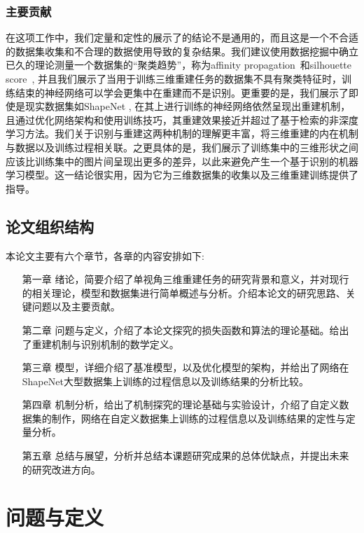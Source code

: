 \documentclass[bachelor, nocolorlinks, printoneside]{seuthesis} %
\begin{document}
\begin{Main}
\subsection{主要贡献}
在这项工作中，我们定量和定性的展示了\cite{tatarchenko2019single}的结论不是通用的，而且这是一个不合适的数据集收集和不合理的数据使用导致的复杂结果。我们建议使用数据挖掘中确立已久的理论测量一个数据集的“聚类趋势”，称为affinity propagation~\cite{wang2008adaptive}和silhouette score~\cite{van2015using}, 并且我们展示了当用于训练三维重建任务的数据集不具有聚类特征时，训练结束的神经网络可以学会更集中在重建而不是识别。更重要的是，我们展示了即使是现实数据集如ShapeNet \cite{chang2015shapenet}, 在其上进行训练的神经网络依然呈现出重建机制，且通过优化网络架构和使用训练技巧，其重建效果接近并超过了基于检索的非深度学习方法。我们关于识别与重建这两种机制的理解更丰富，将三维重建的内在机制与数据以及训练过程相关联。之更具体的是，我们展示了训练集中的三维形状之间应该比训练集中的图片间呈现出更多的差异，以此来避免产生一个基于识别的机器学习模型。这一结论很实用，因为它为三维数据集的收集以及三维重建训练提供了指导。
\section{论文组织结构}
本论文主要有六个章节，各章的内容安排如下:
\begin{itemize}[\hspace{2cm}]
    \item[第一章] 绪论，简要介绍了单视角三维重建任务的研究背景和意义，并对现行的相关理论，模型和数据集进行简单概述与分析。介绍本论文的研究思路、关键问题以及主要贡献。
    \item[第二章] 问题与定义，介绍了本论文探究的损失函数和算法的理论基础。给出了重建机制与识别机制的数学定义。
    \item[第三章] 模型，详细介绍了基准模型，以及优化模型的架构，并给出了网络在ShapeNet大型数据集上训练的过程信息以及训练结果的分析比较。
    \item[第四章] 机制分析，给出了机制探究的理论基础与实验设计，介绍了自定义数据集的制作，网络在自定义数据集上训练的过程信息以及训练结果的定性与定量分析。
    \item[第五章] 总结与展望，分析并总结本课题研究成果的总体优缺点，并提出未来的研究改进方向。
\end{itemize}
\chapter{问题与定义}

\end{Main}
\end{document}
